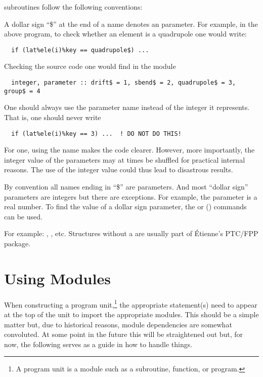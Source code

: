 {{{{{{\bmad subroutines follow the following conventions:

\begin{description}

\item[A ``\$'' suffix denotes a parameter:] 
A dollar sign ``\$'' at the end of a name denotes an 
parameter. For example, in the above program, to check
whether an element is a quadrupole one would write:
\begin{verbatim}
  if (lat%ele(i)%key == quadrupole$) ...
\end{verbatim}
Checking the source code one would find in the module 
\begin{verbatim}
  integer, parameter :: drift$ = 1, sbend$ = 2, quadrupole$ = 3, group$ = 4
\end{verbatim}
One should always use the parameter name instead of the integer it represents.
That is, one should never write
\begin{verbatim}
  if (lat%ele(i)%key == 3) ...  ! DO NOT DO THIS!
\end{verbatim}
For one, using the name makes the code clearer. However, more
importantly, the integer value of the parameters may at times be
shuffled for practical internal reasons. The use of the integer value
could thus lead to disastrous results. 

By convention all names ending in ``\$'' are parameters. And most ``dollar sign'' parameters are
integers but there are exceptions. For example, the parameter  is a real number.
To find the value of a dollar sign parameter, the  or  () commands
can be used.

\item[Structure names have a ``_struct'' suffix:]
For example: , , etc. Structures without a 
 are usually part of \'Etienne's PTC/FPP package.

\end{description}

\section {Using Modules}
\label{s:modules}

When constructing a program unit,\footnote
  {
A program unit is a module such as a subroutine, function, or program.
  }
the appropriate  statement(s) need to appear at the top of the unit to import the
appropriate modules. This should be a simple matter but, due to historical reasons, \bmad module
dependencies are somewhat convoluted. At some point in the future this will be straightened out
but, for now, the following serves as a guide in how to handle things.

}}}}}}
